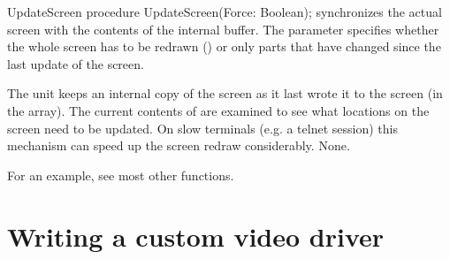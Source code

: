 \begin{procedure}{UpdateScreen}
\Declaration
procedure UpdateScreen(Force: Boolean); 
\Description
{} synchronizes the actual screen with the contents
of the  internal buffer. The parameter 
specifies whether the whole screen has to be redrawn ()
or only parts that have changed since the last update of the screen.

The  unit keeps an internal copy of the screen as it last 
wrote it to the screen (in the  array). The current 
contents of  are examined to see what locations on the 
screen need to be updated. On slow terminals (e.g. a \linux telnet 
session) this mechanism can speed up the screen redraw considerably.
\Errors
None.
\SeeAlso
{}
\end{procedure}

For an example, see most other functions.

\section{Writing a custom video driver}
\label{se:viddriver}
